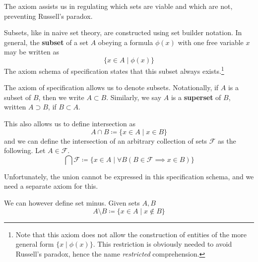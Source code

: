   The axiom assists us in regulating which sets are viable and which are not, preventing Russell's paradox. 

  \begin{axiom}
    Subsets, like in naive set theory, are constructed using set builder notation. In general, the \textbf{subset} of a set $A$ obeying a formula $\phi(x)$ with one free variable $x$ may be written as 
    \begin{equation}
      \{x \in A \mid \phi(x) \}
    \end{equation}
    The axiom schema of specification states that this subset always exists.\footnote{Note that this axiom does not allow the construction of entities of the more general form $\{x \mid \phi(x)\}$. This restriction is obviously needed to avoid Russell's paradox, hence the name \textit{restricted} comprehension. } 
  \end{axiom}  

  \begin{definition}
    The axiom of specification allows us to denote subsets. Notationally, if $A$ is a subset of $B$, then we write $A \subset B$. Similarly, we say $A$ is a \textbf{superset} of $B$, written $A \supset B$, if $B \subset A$. 
  \end{definition} 
  
  \begin{definition}[Intersection]
    This also allows us to define intersection as 
    \begin{equation}
      A \cap B \coloneqq \{x \in A \mid x \in B \}
    \end{equation} 
    and we can define the intersection of an arbitrary collection of sets $\mathcal{F}$ as the following. Let $A \in \mathcal{F}$.  
    \begin{equation}
      \bigcap \mathcal{F} \coloneqq \{x \in A \mid \forall B (B \in \mathcal{F} \implies x \in B) \}
    \end{equation}
  \end{definition}

  Unfortunately, the union cannot be expressed in this specification schema, and we need a separate axiom for this. 

  \begin{definition}
    We can however define set minus. Given sets $A, B$
    \begin{equation}
      A \setminus B \coloneqq \{ x \in A \mid x \not\in B \}
    \end{equation}
  \end{definition}

